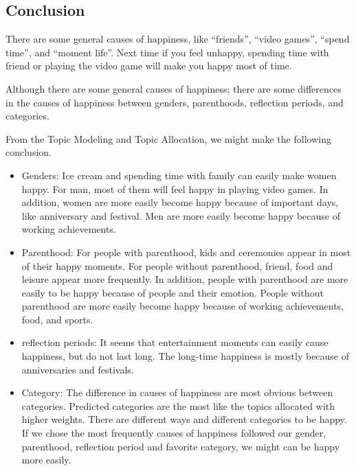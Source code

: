 \documentclass[]{article}
\begin{document}
\subsection{Conclusion}\label{conclusion}

There are some general causes of happiness, like ``friends'', ``video
games'', ``spend time'', and ``moment life''. Next time if you feel
unhappy, spending time with friend or playing the video game will make
you happy most of time.

Although there are some general causes of happiness; there are some
differences in the causes of happiness between genders, parenthoods,
reflection periods, and categories.

From the Topic Modeling and Topic Allocation, we might make the
following conclusion.

\begin{itemize}
\item
  Genders: Ice cream and spending time with family can easily make women
  happy. For man, most of them will feel happy in playing video games.
  In addition, women are more easily become happy because of important
  days, like anniversary and festival. Men are more easily become happy
  because of working achievements.
\item
  Parenthood: For people with parenthood, kids and ceremonies appear in
  most of their happy moments. For people without parenthood, friend,
  food and leisure appear more frequently. In addition, people with
  parenthood are more easily to be happy because of people and their
  emotion. People without parenthood are more easily become happy
  because of working achievements, food, and sports.
\item
  reflection periods: It seems that entertainment moments can easily
  cause happiness, but do not last long. The long-time happiness is
  mostly because of anniversaries and festivals.
\item
  Category: The difference in causes of happiness are most obvious
  between categories. Predicted categories are the most like the topics
  allocated with higher weights. There are different ways and different
  categories to be happy. If we chose the most frequently causes of
  happiness followed our gender, parenthood, reflection period and
  favorite category, we might can be happy more easily.
\end{itemize}
\end{document}
